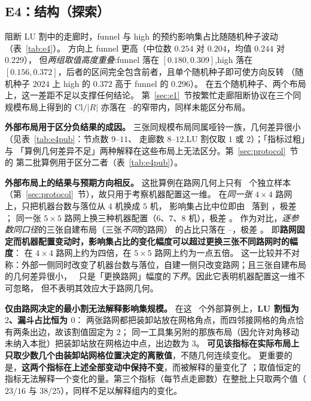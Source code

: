 \subsection{E4：结构（探索）}
\label{sec:e4}

阻断 LU 割中的走廊时，funnel 与 high 的预约影响集占比随随机种子波动（表~\ref{tab:e4}）。
方向上 funnel 更高（中位数 \(0.254\) 对 \(0.204\)，均值 \(0.244\) 对 \(0.229\)），
但\emph{两组取值高度重叠}:funnel 落在 \([0.180,0.309]\),high 落在
\([0.156,0.372]\)，后者的区间完全包含前者，且单个随机种子即可使方向反转
（随机种子 \(2024\) 上 high 的 \(0.372\) 高于 funnel 的 \(0.296\)）。
在五个随机种子、两个布局上，这一差距不足以支撑任何结论。
第~\ref{sec:e1}~节按繁忙走廊阻断协议在三个同规模布局上得到的
\(\mathrm{Cl}/|R|\) 亦落在 \EoneCloLo--\EoneCloHi 的窄带内，同样未能区分布局。

\textbf{外部布局用于区分负结果的成因。}
三张同规模布局同属哑铃一族，几何差异很小（见表~\ref{tab:e4pub}：节点数 \(9\)--\(11\)、
走廊数 \(8\)--\(12\),LU 割仅取 \(1\) 或 \(2\)）；「指标过粗」与
「算例几何差异不足」两种解释在这些布局上无法区分。第~\ref{sec:protocol}~节的
第二批算例用于区分二者（表~\ref{tab:e4pub}）。

\textbf{外部布局上的结果与预期方向相反。}
这批算例在路网几何上只有 \NPubNets\ 个独立样本（第~\ref{sec:protocol}~节），故只用于考察机器配置这一维。
在\emph{同一张} \(4\times 4\) 路网上，只把机器台数与落位从 \(4\) 机换成 \(5\) 机，
影响集占比中位即由 \PubCloHi\ 落到 \PubCloLo，极差 \PubCloSpread；
同一张 \(5\times 5\) 路网上换三种机器配置（\(6\)、\(7\)、\(8\) 机），极差 \PubCloSpreadBig。
作为对比，\emph{逐参数同口径}的三张自建布局（三张\emph{不同}的路网）
的占比只落在 \SelfCloLo--\SelfCloHi，极差 \SelfCloSpread。
即\textbf{路网固定而机器配置变动时，影响集占比的变化幅度可以超过更换三张不同路网时的幅度}：
在 \(4\times 4\) 路网上约为四倍，在 \(5\times 5\) 路网上约为一点五倍。
这一比较并不对称：外部一侧同时改变了机器台数与落位，自建一侧只改变路网；且三张自建布局的几何差异很小，
\SelfCloSpread\ 只是「更换路网」幅度的\emph{下界}。因此它表明机器配置这一维不可忽略，
但不表明其效应大于路网几何。

\textbf{仅由路网决定的最小割无法解释影响集规模。}
在这 \NPubInst\ 个外部算例上，\textbf{LU 割恒为 \(2\)、漏斗占比恒为 \(0\)}：
两张路网都把装卸站放在网格角点，而四邻接网格的角点恰有两条出边，故该割值固定为 \(2\)；
同一工具集另附的那族布局（因允许对角移动未纳入本批）把装卸站放在网格边中点，出边数为 \(3\)。
\textbf{可见该指标在实际布局上只取少数几个由装卸站网格位置决定的离散值}，不随几何连续变化。
更重要的是，\textbf{这两个指标在上述全部变动中保持不变}，而被解释的量变化了
\PubCloSpread；取值恒定的指标无法解释一个变化的量。第三个指标（每节点走廊数）在整批上只取两个值（\(23/16\) 与
\(38/25\)），同样不足以解释组内的变化。


